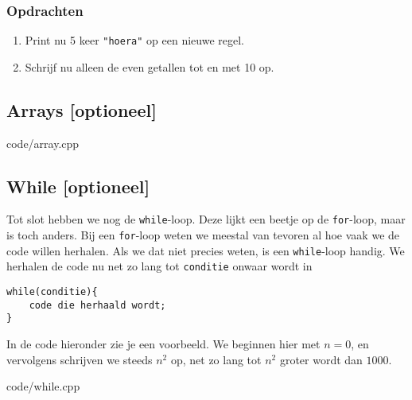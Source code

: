 \documentclass[12pt,a4paper]{article}
\newcommand{\code}{}
\newcommand{\icode}{\lstinline}
\begin{document}
\subsubsection{Opdrachten}
\begin{enumerate}
	\item
		Print nu 5 keer \icode{"hoera"} op een nieuwe regel.
	\item
		Schrijf nu alleen de even getallen tot en met 10 op.
\end{enumerate}

\clearpage
\subsection{Arrays [optioneel]}

\code{code/array.cpp}

\subsection{While [optioneel]}
Tot slot hebben we nog de \icode{while}-loop. Deze lijkt een beetje op de \icode{for}-loop, maar is toch anders. Bij een \icode{for}-loop weten we meestal van tevoren al hoe vaak we de code willen herhalen. Als we dat niet precies weten, is een \icode{while}-loop handig. We herhalen de code nu net zo lang tot \icode{conditie} onwaar wordt in
\begin{lstlisting}
while(conditie){
	code die herhaald wordt;
}
\end{lstlisting}
In de code hieronder zie je een voorbeeld. We beginnen hier met $n=0$, en vervolgens schrijven we steeds $n^2$ op, net zo lang tot $n^2$ groter wordt dan $1000$.

\code{code/while.cpp}

\clearpage
\end{document}
